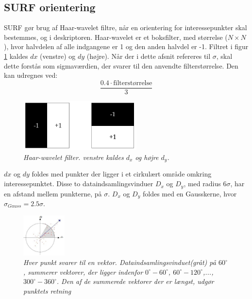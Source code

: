\subsection{SURF orientering}
SURF gør brug af Haar-wavelet filtre, når en orientering for interessepunkter skal bestemmes, og i deskriptoren. Haar-wavelet er et boksfilter, med størrelse ($N\times N$), hvor halvdelen af alle indgangene er 1 og den anden halvdel er -1. Filtret i figur \ref{fig:haarwavelet} kaldes $dx$ (venstre) og $dy$ (højre).
Når der i dette afsnit refereres til $\sigma$, skal dette forstås som sigmaværdien, der svarer til den anvendte filterstørrelse. Den kan udregnes ved:
\begin{equation}
\dfrac{0.4\cdot\text{filterstørrelse}}{3}
\end{equation}
\begin{figure}[H]
    \centering
    \includegraphics[width=0.55\textwidth]{fig/haarwavelet.png}
     \vspace{-1em}
    \begin{center}    
       \caption{\footnotesize \textit{{Haar-wavelet filter. venstre kaldes $d_x$ og højre $d_y$.}}}
    \label{fig:haarwavelet}
     \end{center}
     \vspace{-2.5em}
  \end{figure} \noindent
$dx$ og $dy$ foldes med punkter der ligger i et cirkulært område omkring interessepunktet. Disse to dataindsamlingsvinduer $D_x$ og $D_y$, med radius $6\sigma$, har en afstand mellem punkterne, på $\sigma$. $D_x$ og $D_y$ foldes med en Gausskerne, hvor $\sigma_{Gauss} = 2.5\sigma$.
\begin{figure}[H]
    \centering
    \includegraphics[width=0.2\textwidth]{fig/surforientation.jpg}
     \vspace{-1em}
    \begin{center}    
       \caption{{\footnotesize \textit{Hver punkt svarer til en vektor. Dataindsamlingsvinduet(gråt) på $60^{\circ}$, summerer vektorer, der ligger indenfor $0^{\circ}-60^{\circ}$, $60^{\circ}-120^{\circ}$,..., $300^{\circ}-360^{\circ}$. Den af de summerede vektorer der er længst, udgør punktets retning}}}
    \label{fig:surforientation}
     \end{center}
     \vspace{-2.5em}
  \end{figure} \noindent
